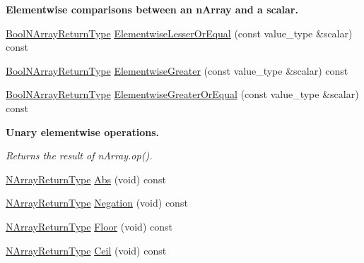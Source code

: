 \begin{Indent}{\bf Elementwise comparisons between an n\-Array and a scalar.}
\begin{DoxyCompactItemize}
\item 
\hyperlink{classvct_dynamic_const_n_array_base_a983f2b7edd51a896d447383b5a5af289}{Bool\-N\-Array\-Return\-Type} \hyperlink{classvct_dynamic_const_n_array_base_af2c00fe0d0b7695bfb41611c66137701}{Elementwise\-Lesser\-Or\-Equal} (const value\-\_\-type \&scalar) const 
\item 
\hyperlink{classvct_dynamic_const_n_array_base_a983f2b7edd51a896d447383b5a5af289}{Bool\-N\-Array\-Return\-Type} \hyperlink{classvct_dynamic_const_n_array_base_a9bc8ac6d6d65042d8957be17aedb4aff}{Elementwise\-Greater} (const value\-\_\-type \&scalar) const 
\item 
\hyperlink{classvct_dynamic_const_n_array_base_a983f2b7edd51a896d447383b5a5af289}{Bool\-N\-Array\-Return\-Type} \hyperlink{classvct_dynamic_const_n_array_base_a9a8b383d9e71ed4b6a2141c94b4263dc}{Elementwise\-Greater\-Or\-Equal} (const value\-\_\-type \&scalar) const 
\end{DoxyCompactItemize}
\end{Indent}
\begin{Indent}{\bf Unary elementwise operations.}\par
{\em Returns the result of n\-Array.\-op(). }\begin{DoxyCompactItemize}
\item 
\hyperlink{classvct_dynamic_const_n_array_base_a7507402a90022d7a14ad7038fac07041}{N\-Array\-Return\-Type} \hyperlink{classvct_dynamic_const_n_array_base_ac59e344e65a9c5af70f18c581ec49422}{Abs} (void) const 
\item 
\hyperlink{classvct_dynamic_const_n_array_base_a7507402a90022d7a14ad7038fac07041}{N\-Array\-Return\-Type} \hyperlink{classvct_dynamic_const_n_array_base_aedc44fa6c64601af5f40ef2a2b1a126c}{Negation} (void) const 
\item 
\hyperlink{classvct_dynamic_const_n_array_base_a7507402a90022d7a14ad7038fac07041}{N\-Array\-Return\-Type} \hyperlink{classvct_dynamic_const_n_array_base_acf9a195f38bcdad678d1e6ff532437f0}{Floor} (void) const 
\item 
\hyperlink{classvct_dynamic_const_n_array_base_a7507402a90022d7a14ad7038fac07041}{N\-Array\-Return\-Type} \hyperlink{classvct_dynamic_const_n_array_base_aed5a0bb491ffbeb4a9c5fb4101e5455d}{Ceil} (void) const 
\end{DoxyCompactItemize}
\end{Indent}
